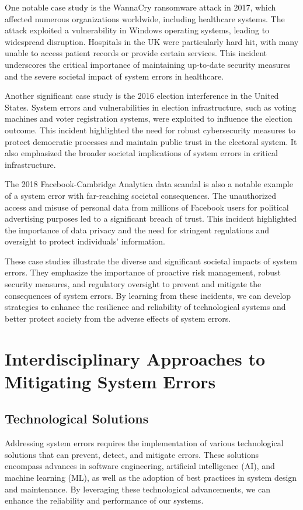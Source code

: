\documentclass[10pt, conference, letterpaper]{IEEEtran}
\begin{document}
One notable case study is the WannaCry ransomware attack in 2017, which affected numerous organizations worldwide, including healthcare systems. The attack exploited a vulnerability in Windows operating systems, leading to widespread disruption. Hospitals in the UK were particularly hard hit, with many unable to access patient records or provide certain services. This incident underscores the critical importance of maintaining up-to-date security measures and the severe societal impact of system errors in healthcare.

Another significant case study is the 2016 election interference in the United States. System errors and vulnerabilities in election infrastructure, such as voting machines and voter registration systems, were exploited to influence the election outcome. This incident highlighted the need for robust cybersecurity measures to protect democratic processes and maintain public trust in the electoral system. It also emphasized the broader societal implications of system errors in critical infrastructure.

The 2018 Facebook-Cambridge Analytica data scandal is also a notable example of a system error with far-reaching societal consequences. The unauthorized access and misuse of personal data from millions of Facebook users for political advertising purposes led to a significant breach of trust. This incident highlighted the importance of data privacy and the need for stringent regulations and oversight to protect individuals' information.

These case studies illustrate the diverse and significant societal impacts of system errors. They emphasize the importance of proactive risk management, robust security measures, and regulatory oversight to prevent and mitigate the consequences of system errors. By learning from these incidents, we can develop strategies to enhance the resilience and reliability of technological systems and better protect society from the adverse effects of system errors.

\section{Interdisciplinary Approaches to Mitigating System Errors}
\subsection{Technological Solutions}
Addressing system errors requires the implementation of various technological solutions that can prevent, detect, and mitigate errors. These solutions encompass advances in software engineering, artificial intelligence (AI), and machine learning (ML), as well as the adoption of best practices in system design and maintenance. By leveraging these technological advancements, we can enhance the reliability and performance of our systems.
\end{document}
